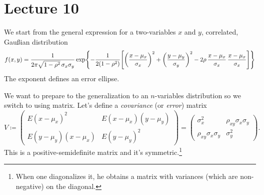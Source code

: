 
\chapter{Lecture 10}

We start from the general expression for a two-variables $x$ and $y$, correlated, Gau\ss{}ian distribution
\begin{equation}
	f(x,y) = \frac{1}{2\pi\sqrt{1-\rho^2}\,\sigma_x\sigma_y}\exp\gp*{-\frac{1}{2(1-\rho^2)}
		\qp*{\left(\frac{x-\mu_x}{\sigma_x}\right)^2+
			\left(\frac{y-\mu_y}{\sigma_y}\right)^2
	-2\rho\,\frac{x-\mu_x}{\sigma_x}\,\frac{x-\mu_x}{\sigma_x}}}
\end{equation}
The exponent defines an error ellipse.


We want to prepare to the generalization to an $n$-variables distribution so we switch to using matrix.
Let's define a \emph{covariance} (or \emph{error}) matrix
\begin{equation}
	V\coloneqq 
	\begin{pmatrix}
		E(x-\mu_x)^2	&E(x-\mu_x)(y-\mu_y)\\
		E(y-\mu_y)(x-\mu_x) & E(y-\mu_y)^2
	\end{pmatrix}
	=
	\begin{pmatrix}
		\sigma_x^2	&\rho_{xy}\sigma_x\sigma_y\\
		\rho_{xy}\sigma_x\sigma_y &\sigma_y^2
	\end{pmatrix}.
\end{equation}
This is a positive-semidefinite matrix and it's symmetric.\footnote{When one diagonalizes it, he obtains a matrix with variances (which are non-negative) on the diagonal.}

